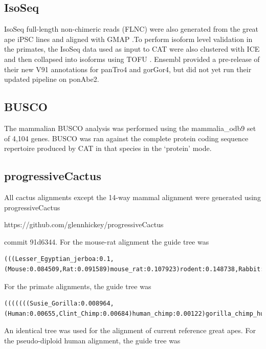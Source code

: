\documentclass[fleqn,10pt]{wlscirep}
\begin{document}
\subsection*{IsoSeq}
IsoSeq full-length non-chimeric reads (FLNC) were also generated from the great ape iPSC lines and aligned with GMAP \cite{wu2005gmap}.To perform isoform level validation in the primates, the IsoSeq data used as input to CAT were also clustered with ICE and then collapsed into isoforms using TOFU \cite{gordon2015widespread}. Ensembl provided a pre-release of their new V91 annotations for panTro4 and gorGor4, but did not yet run their updated pipeline on ponAbe2.

\subsection*{BUSCO}
The mammalian BUSCO analysis was performed using the mammalia\_odb9 set of 4,104 genes. BUSCO was ran against the complete protein coding sequence repertoire produced by CAT in that species in the `protein' mode.

\subsection*{progressiveCactus}
	All cactus alignments except the 14-way mammal alignment were generated using progressiveCactus 
    
https://github.com/glennhickey/progressiveCactus

commit 91d6344. For the mouse-rat alignment the guide tree was 

\begin{lstlisting}[breaklines=true]
(((Lesser_Egyptian_jerboa:0.1,(Mouse:0.084509,Rat:0.091589)mouse_rat:0.107923)rodent:0.148738,Rabbit:0.21569)glires:0.015313,Human:0.143908)root;
\end{lstlisting}
    
For the primate alignments, the guide tree was 
    
\begin{lstlisting}[breaklines=true]
(((((((Susie_Gorilla:0.008964,(Human:0.00655,Clint_Chimp:0.00684)human_chimp:0.00122)gorilla_chimp_human:0.009693,Susie_Orangutan:0.01894)great_ape:0.003471,Gibbon:0.02227)great_ape_gibbon:0.01204,Rhesus:0.004991)old_world_monkey:0.02183,Squirrel_monkey:0.01035)monkey:0.05209,Bushbaby:0.1194)primate_anc:0.013494,Mouse:0.084509)root;
\end{lstlisting}
    
An identical tree was used for the alignment of current reference great apes. For the pseudo-diploid human alignment, the guide tree was 
    
\end{document}
